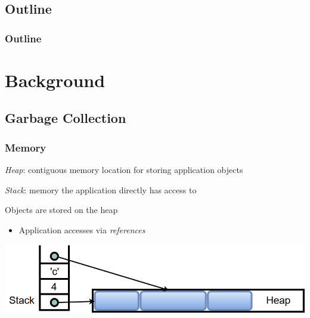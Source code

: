 \documentclass{beamer}
\newcommand{\linespace}{\vskip 0.25cm}
\begin{document}
\subsection*{Outline}

\begin{frame}
  \frametitle{Outline}
  \tableofcontents  
\end{frame}



\section[Background]{Background}

\subsection[GC Basics]{Garbage Collection}

\begin{frame}

\frametitle{Memory}

\emph{Heap}: contiguous memory location for storing application objects

\linespace
\linespace

\emph{Stack}: memory the application directly has access to

\linespace
\linespace

Objects are stored on the heap
\begin{itemize}
\item Application accesses via \emph{references}
\end{itemize}

\linespace
\linespace

\begin{center}
\includegraphics[width=.8\textwidth]{Illustrations/stack_and_heap.png}
\end{center}

\end{frame}
\end{document}

